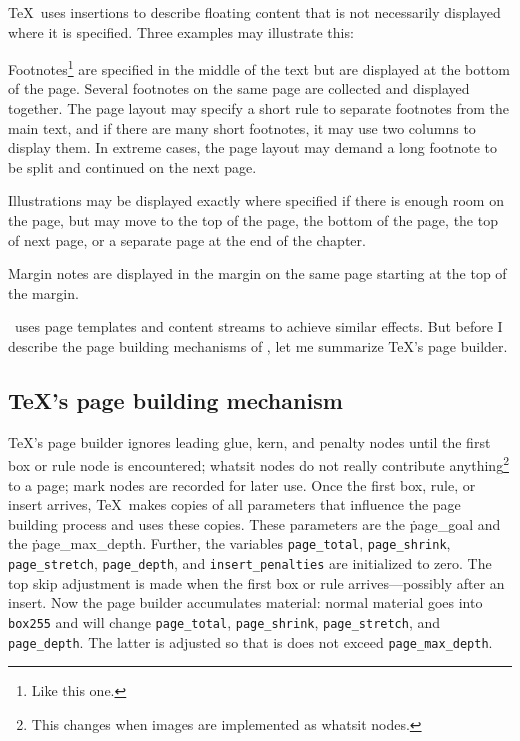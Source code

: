 \TeX\ uses insertions to describe floating content that is not necessarily displayed 
where it is specified. Three examples may illustrate this:
\itemize
\item Footnotes\footnote*{Like this one.}  are specified in the middle of the text but are displayed at the
bottom of the page.  Several
footnotes on the same page are collected and displayed together. The
page layout may specify a short rule to separate footnotes from the
main text, and if there are many short footnotes, it may use two columns
to display them.  In extreme cases, the page layout may demand a long
footnote to be split and continued on the next page.

\item Illustrations may be displayed exactly where specified if there is enough
room on the page, but may move to the top of the page, the bottom of the page,
the top of next page, or a separate page at the end of the chapter.

\item Margin notes are displayed in the margin on the same page starting at the top
of the margin.
\enditemize

\HINT\ uses page templates and content streams to achieve similar effects.
But before I describe the page building mechanisms of \HINT,
let me summarize \TeX's page builder.

\subsection{\TeX's page building mechanism}
\TeX's page builder ignores leading glue, kern,
and penalty nodes until the first
box or rule node is encountered;
whatsit nodes do not really contribute 
anything\footnote*{This changes when images are implemented as whatsit nodes.} to
a page; mark nodes are recorded for later use.  Once
the first box, rule, or insert arrives, \TeX\ makes
copies of all parameters that influence the page building process and
uses these copies. These parameters are the \.{page\_goal} and the
\.{page\_max\_depth}. Further, the variables {\tt page\_total}, {\tt page\_shrink},
{\tt page\_stretch}, {\tt page\_depth}, and {\tt in\-sert\_pe\-nal\-ties} are
initialized to zero.  The top skip adjustment is made
when the first box or rule arrives---possibly after an insert.
Now the page builder accumulates material: normal material goes
into {\tt box255} and will change {\tt page\_total}, {\tt page\_shrink}, 
{\tt page\_stretch}, and {\tt page\_depth}. The latter is adjusted so that 
is does not exceed {\tt page\_max\_depth}.

